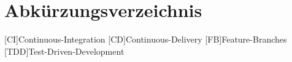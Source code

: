 \chapter{Abkürzungsverzeichnis}

\begin{acronym}
[CI]{Continuous-Integration}
[CD]{Continuous-Delivery}
[FB]{Feature-Branches}
[TDD]{Test-Driven-Development}
\end{acronym}

